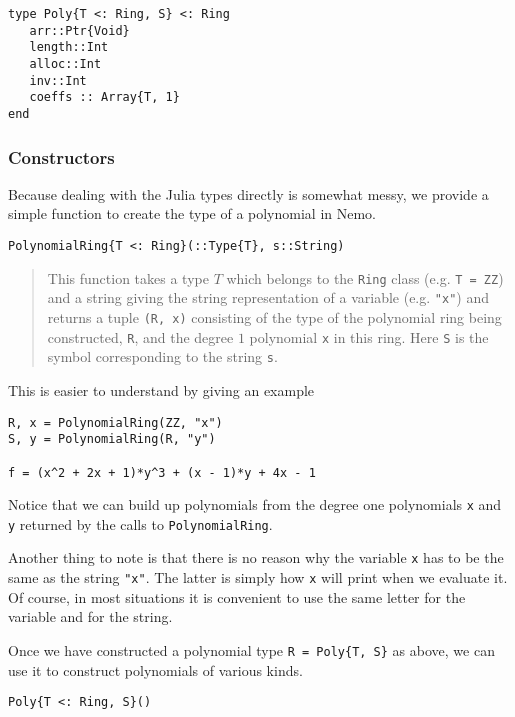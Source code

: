 \documentclass[a4paper,10pt]{article}
\newcommand{\code}{\lstinline}
\newcommand{\desc}[1]{\vspace{-3mm}\begin{quote}#1\end{quote}}
\begin{document}
{{{\begin{lstlisting}
type Poly{T <: Ring, S} <: Ring
   arr::Ptr{Void}
   length::Int
   alloc::Int
   inv::Int
   coeffs :: Array{T, 1}
end
\end{lstlisting}

\subsubsection{Constructors}

Because dealing with the Julia types directly is somewhat messy, we provide a simple
function to create the type of a polynomial in Nemo.

\begin{lstlisting}
PolynomialRing{T <: Ring}(::Type{T}, s::String)
\end{lstlisting}

\desc{This function takes a type $T$ which belongs to the \code|Ring| class 
(e.g. \code|T = ZZ|) and a string giving the string representation of a variable (e.g. 
\code|"x"|) and returns a tuple \code|(R, x)| consisting of the type of the polynomial
ring being constructed, \code|R|, and the degree $1$ polynomial \code|x| in this ring. 
Here \code|S| is the symbol corresponding to the string \code|s|.}

This is easier to understand by giving an example

\begin{lstlisting}
R, x = PolynomialRing(ZZ, "x")
S, y = PolynomialRing(R, "y")

f = (x^2 + 2x + 1)*y^3 + (x - 1)*y + 4x - 1
\end{lstlisting}

Notice that we can build up polynomials from the degree one polynomials \code{x} and
\code{y} returned by the calls to \code{PolynomialRing}. 

Another thing to note is that there is no reason why the variable \code{x} has to 
be the same as the string \code{"x"}. The latter is simply how \code{x} will print
when we evaluate it. Of course, in most situations it is convenient to use the same 
letter for the variable and for the string.

Once we have constructed a polynomial type \code|R = Poly{T, S}| as above, we can
use it to construct polynomials of various kinds.

\begin{lstlisting}
Poly{T <: Ring, S}()
\end{lstlisting}

}}}
\end{document}
